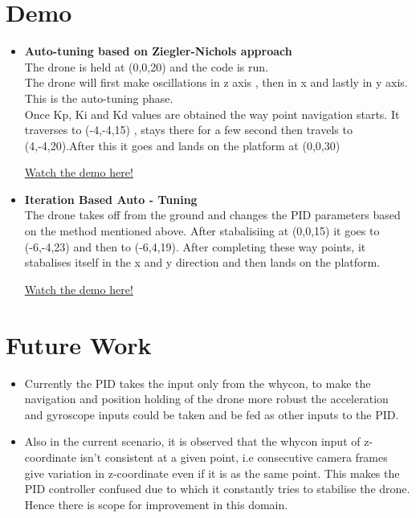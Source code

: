 \documentclass[a4paper,12pt,oneside]{book}
\begin{document}
\pagebreak
\section{Demo}
\begin{itemize}
    \item \textbf{Auto-tuning based on Ziegler-Nichols approach}\\
    The drone is held at (0,0,20) and the code is run.\\
    The drone will first make oscillations in z axis , then in x and lastly in y axis.
    This is the auto-tuning phase.\\
    Once Kp, Ki and Kd values are obtained the way point navigation starts.
    It traverses to (-4,-4,15) , stays there for a few second then travels to (4,-4,20).After this it goes and lands on the platform at (0,0,30)
    
    \href{https://www.youtube.com/watch?v=gwrFjAuiXX0&feature=youtu.be}{Watch the demo here!}
    
    \item \textbf{Iteration Based Auto - Tuning}\\
    The drone takes off from the ground and changes the PID parameters based on the method mentioned above. After stabalisiing at (0,0,15) it goes to (-6,-4,23) and then to (-6,4,19). After completing these way points, it stabalises itself in the x and y direction and then lands on the platform.
    
    
    \href{https://youtu.be/kUO_1k9NcYQ}{Watch the demo here!}
    
    
\end{itemize}


\section{Future Work}
\begin{itemize}
    \item Currently the PID takes the input only from the whycon, to make the navigation and position holding of the drone more robust the acceleration and gyroscope inputs could be taken and be fed as other inputs to the PID.
    \item Also in the current scenario, it is observed that the whycon input of z-coordinate isn't consistent at a given point, i.e consecutive camera frames give variation in z-coordinate even if it is as the same point. This makes the PID controller confused due to which it constantly tries to stabilise the drone. Hence there is scope for improvement in this domain. 
\end{itemize}
\end{document}
